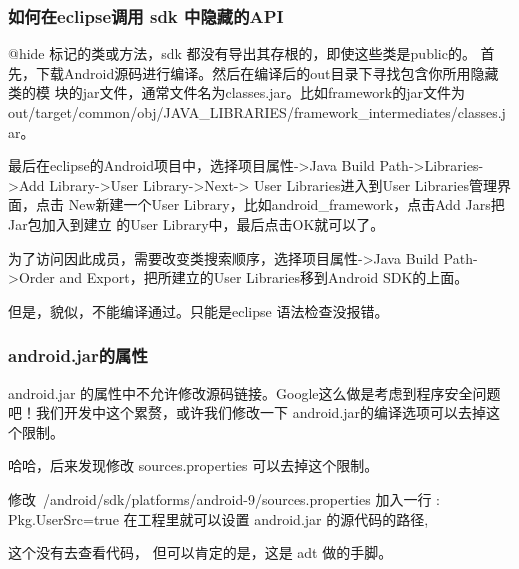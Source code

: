 \documentclass[a4paper,titlepage]{article}
\begin{document}
\subsubsection{如何在eclipse调用 sdk 中隐藏的API}
@hide 标记的类或方法，sdk 都没有导出其存根的，即使这些类是public的。
首先，下载Android源码进行编译。然后在编译后的out目录下寻找包含你所用隐藏类的模
块的jar文件，通常文件名为classes.jar。比如framework的jar文件为
out/target/common/obj/JAVA_LIBRARIES/framework_intermediates/classes.jar。


最后在eclipse的Android项目中，选择项目属性->Java Build Path->Libraries->Add
Library->User Library->Next-> User Libraries进入到User Libraries管理界面，点击
New新建一个User Library，比如android_framework，点击Add Jars把Jar包加入到建立
的User Library中，最后点击OK就可以了。

为了访问因此成员，需要改变类搜索顺序，选择项目属性->Java Build Path->Order
and Export，把所建立的User Libraries移到Android SDK的上面。

但是，貌似，不能编译通过。只能是eclipse 语法检查没报错。

\subsubsection{android.jar的属性}

android.jar 的属性中不允许修改源码链接。Google这么做是考虑到程序安全问题吧！我们开发中这个累赘，或许我们修改一下 android.jar的编译选项可以去掉这个限制。

哈哈，后来发现修改 sources.properties 可以去掉这个限制。

修改~/android/sdk/platforms/android-9/sources.properties
加入一行 : 
 Pkg.UserSrc=true
在工程里就可以设置 android.jar 的源代码的路径,

这个没有去查看代码， 但可以肯定的是，这是 adt 做的手脚。
\end{document}

